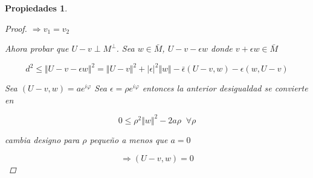 \documentclass[a4paper,10pt]{book}
\def \ep{\epsilon}
\newtheorem{propiedades}{Propiedades}
\begin{document}
\begin{propiedades}
\begin{enumerate}
\begin{proof}
        $\Rightarrow v_1 = v_2$

        
        Ahora probar que $U-v\perp  M^\perp $. Sea $w\in \bar{M}$, $U-v -\epsilon w $ donde $v+\epsilon w \in \bar{M}$

        \[d^2 \leq \Vert U-v-\epsilon w\Vert^2 = \Vert U-v\Vert^2 +|\ep|^2 \Vert w\Vert - \bar{\ep} (U -v, w) -\ep (w,U-v) \]

        Sea $(U-v,w)= a e^{i\varphi}$  Sea $\ep= \rho e^{i\varphi} $ entonces la anterior desigualdad se convierte en
        
        \[ 0\leq \rho^2 \Vert w\Vert^2 -2 a \rho \;\; \forall \rho \]

        cambia designo para $\rho$ pequeño a menos que $a=0$

        \[\Rightarrow (U-v,w)=0\]

    \end{proof}
    
\end{enumerate}

\end{propiedades}
\end{document}
